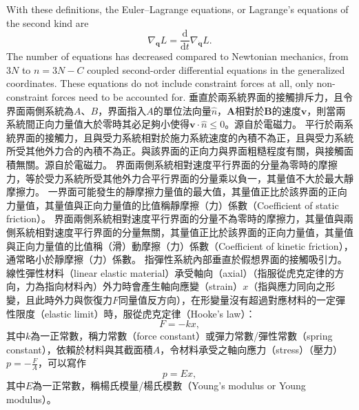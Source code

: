 \documentclass[a4paper,12pt]{article}
\begin{document}
With these definitions, the Euler–Lagrange equations, or Lagrange's equations of the second kind are
\[\nabla_{\mathbf{q}}L=\frac{\mathrm{d}}{\mathrm{d}t}\nabla_{\dot{\mathbf{q}}}L.\]
The number of equations has decreased compared to Newtonian mechanics, from $3N$ to $n = 3N − C$ coupled second-order differential equations in the generalized coordinates. These equations do not include constraint forces at all, only non-constraint forces need to be accounted for.
垂直於兩系統界面的接觸排斥力，且令界面兩側系統為$A$、$B$，界面指入$A$的單位法向量$\hat{n}$，$\mathbf{A}$相對於$\mathbf{B}$的速度$\mathbf{v}$，則當兩系統間正向力量值大於零時其必足夠小使得$\mathbf{v}\cdot\hat{n}\leq 0$。源自於電磁力。
平行於兩系統界面的接觸力，且與受力系統相對於施力系統速度的內積不為正，且與受力系統所受其他外力合的內積不為正。與該界面的正向力與界面粗糙程度有關，與接觸面積無關。源自於電磁力。
界面兩側系統相對速度平行界面的分量為零時的摩擦力，等於受力系統所受其他外力合平行界面的分量乘以負一，其量值不大於最大靜摩擦力。
一界面可能發生的靜摩擦力量值的最大值，其量值正比於該界面的正向力量值，其量值與正向力量值的比值稱靜摩擦（力）係數（Coefficient of static friction）。
界面兩側系統相對速度平行界面的分量不為零時的摩擦力，其量值與兩側系統相對速度平行界面的分量無關，其量值正比於該界面的正向力量值，其量值與正向力量值的比值稱（滑）動摩擦（力）係數（Coefficient of kinetic friction），通常略小於靜摩擦（力）係數。
指彈性系統內部垂直於假想界面的接觸吸引力。
線性彈性材料（linear elastic material）承受軸向（axial）（指服從虎克定律的方向，力為指向材料內）外力時會產生軸向應變（strain）$x$（指與應力同向之形變，且此時外力與恢復力$F$同量值反方向），在形變量沒有超過對應材料的一定彈性限度（elastic limit）時，服從虎克定律（Hooke's law）：
\[F=-kx,\]
其中$k$為一正常數，稱力常數（force constant）或彈力常數/彈性常數（spring constant），依賴於材料與其截面積$A$，令材料承受之軸向應力（stress）（壓力）$p=-\frac{F}{A}$，可以寫作
\[p=Ex,\]
其中$E$為一正常數，稱楊氏模量/楊氏模數（Young's modulus or Young modulus）。
\end{document}
